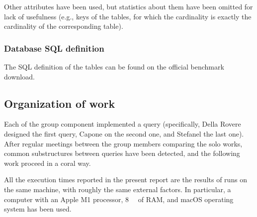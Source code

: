 
Other attributes have been used, but statistics about them have been omitted for lack of usefulness (e.g., keys of the tables, for which the cardinality is exactly the cardinality of the corresponding table).

\subsubsection{Database SQL definition}

The SQL definition of the tables can be found on the official benchmark download.

\subsection{Organization of work}
\label{subsection:organizationwork}

Each of the group component implemented a query (specifically, Della Rovere designed the first query, Capone on the second one, and Stefanel the last one).
After regular meetings between the group members comparing the solo works, common substructures between queries have been detected, and the following work proceed in a coral way.

All the execution times reported in the present report are the results of runs on the same machine, with roughly the same external factors. In particular, a computer with an Apple M1 processor, \SI{8}{\giga\byte} of RAM, and macOS operating system has been used.